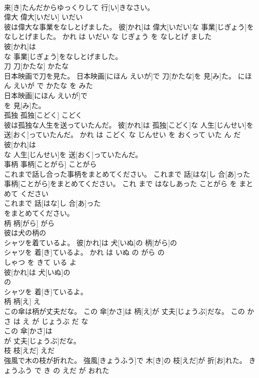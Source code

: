 \documentclass[8pt]{extreport}
\begin{document}
\begin{CJK}{UTF8}{min}
\\	来[き]たんだからゆっくりして 行[い]きなさい。			
\\	偉大	偉大[いだい]	いだい	
\\	彼は偉大な事業をなしとげました。	彼[かれ]は 偉大[いだい]な 事業[じぎょう]をなしとげました。	かれ は いだい な じぎょう を なしとげ ました	
\\	彼[かれ]は
\\	な 事業[じぎょう]をなしとげました。			
\\	刀	刀[かたな]	かたな	
\\	日本映画で刀を見た。	日本映画[にほん えいが]で 刀[かたな]を 見[み]た。	にほん えいが で かたな を みた	
\\	日本映画[にほん えいが]で
\\	を 見[み]た。			
\\	孤独	孤独[こどく]	こどく	
\\	彼は孤独な人生を送っていたんだ。	彼[かれ]は 孤独[こどく]な 人生[じんせい]を 送[おく]っていたんだ。	かれ は こどく な じんせい を おくって いた ん だ	
\\	彼[かれ]は
\\	な 人生[じんせい]を 送[おく]っていたんだ。			
\\	事柄	事柄[ことがら]	ことがら	
\\	これまで話し合った事柄をまとめてください。	これまで 話[はな]し 合[あ]った 事柄[ことがら]をまとめてください。	これ まで はなしあった ことがら を まとめて ください	
\\	これまで 話[はな]し 合[あ]った
\\	をまとめてください。			
\\	柄	柄[がら]	がら	
\\	彼は犬の柄の
\\	シャツを着ているよ。	彼[かれ]は 犬[いぬ]の 柄[がら]の
\\	シャツを 着[き]ているよ。	かれ は いぬ の がら の 
\\	しゃつ を きて いる よ	
\\	彼[かれ]は 犬[いぬ]の
\\	の
\\	シャツを 着[き]ているよ。			
\\	柄	柄[え]	え	
\\	この傘は柄が丈夫だな。	この 傘[かさ]は 柄[え]が 丈夫[じょうぶ]だな。	この かさ は え が じょうぶ だ な	
\\	この 傘[かさ]は
\\	が 丈夫[じょうぶ]だな。			
\\	枝	枝[えだ]	えだ	
\\	強風で木の枝が折れた。	強風[きょうふう]で 木[き]の 枝[えだ]が 折[お]れた。	きょうふう で き の えだ が おれた	

\end{CJK}
\end{document}
